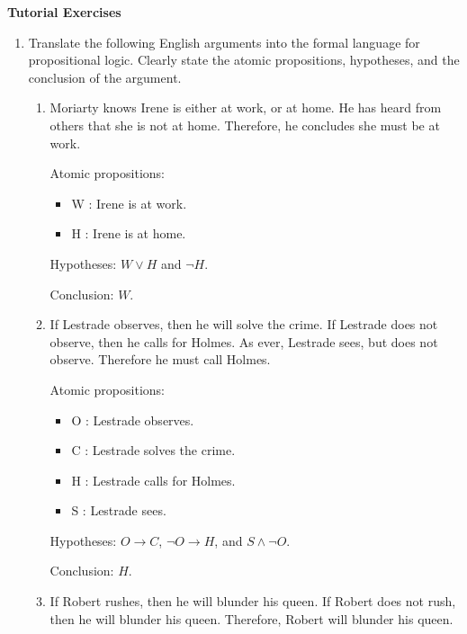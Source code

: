 \documentclass[11pt]{report}
\begin{document}
\newpage
{\bf Tutorial Exercises}
\begin{enumerate}
	
	
	\item Translate the following English arguments into the formal language for propositional logic. Clearly state the atomic propositions, hypotheses, and the conclusion of the argument. 
	
	\begin{enumerate}
		\item Moriarty knows Irene is either at work, or at home. He has heard from others that she is not at home. Therefore, he concludes she must be at work.
		
		\hspace{0.2cm}{\bf Solution}

		Atomic propositions: 

		\begin{itemize}
			\item[] W : Irene is at work.
			\item[] H : Irene is at home.
		\end{itemize}
	
		Hypotheses: $W \lor H$ and $\lnot H$. 
	
		Conclusion: $W$.
		
		\item  If Lestrade observes, then he will solve the crime. If Lestrade does not observe, then he calls for Holmes. As ever, Lestrade sees, but does not observe. Therefore he must call Holmes. 
		
		\hspace{0.2cm}{\bf Solution}

		Atomic propositions: 

		\begin{itemize}
			\item[] O : Lestrade observes. 
			\item[] C : Lestrade solves the crime. 
			\item[] H : Lestrade calls for Holmes. 
			\item[] S : Lestrade sees. 
		\end{itemize}
	
		Hypotheses: $O \to C$, $\lnot O \to H$, and $S \land \lnot O$. 
	
		Conclusion: $H$.

		\item If Robert rushes, then he will blunder his queen. If Robert does not rush, then he will blunder his queen. Therefore, Robert will blunder his queen.
		

\end{enumerate}
\end{enumerate}
\end{document}
